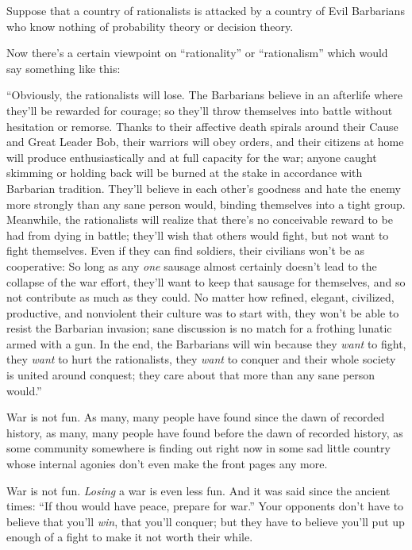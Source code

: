 {
 Suppose that a country of rationalists is attacked by a country of
Evil Barbarians who know nothing of probability theory or decision
theory.}

{
 Now there's a certain viewpoint on
``rationality'' or
``rationalism'' which would say
something like this:}

{
 ``Obviously, the rationalists will lose. The
Barbarians believe in an afterlife where they'll be
rewarded for courage; so they'll throw themselves into
battle without hesitation or remorse. Thanks to their affective death
spirals around their Cause and Great Leader Bob, their warriors will
obey orders, and their citizens at home will produce enthusiastically
and at full capacity for the war; anyone caught skimming or holding
back will be burned at the stake in accordance with Barbarian
tradition. They'll believe in each
other's goodness and hate the enemy more strongly than
any sane person would, binding themselves into a tight group.
Meanwhile, the rationalists will realize that there's
no conceivable reward to be had from dying in battle;
they'll wish that others would fight, but not want to
fight themselves. Even if they can find soldiers, their civilians
won't be as cooperative: So long as any \textit{one}
sausage almost certainly doesn't lead to the collapse
of the war effort, they'll want to keep that sausage
for themselves, and so not contribute as much as they could. No matter
how refined, elegant, civilized, productive, and nonviolent their
culture was to start with, they won't be able to resist
the Barbarian invasion; sane discussion is no match for a frothing
lunatic armed with a gun. In the end, the Barbarians will win because
they \textit{want} to fight, they \textit{want} to hurt the
rationalists, they \textit{want} to conquer and their whole society is
united around conquest; they care about that more than any sane person
would.''}

{
 War is not fun. As many, many people have found since the dawn of
recorded history, as many, many people have found before the dawn of
recorded history, as some community somewhere is finding out right now
in some sad little country whose internal agonies don't
even make the front pages any more.}

{
 War is not fun. \textit{Losing} a war is even less fun. And it was
said since the ancient times: ``If thou would have
peace, prepare for war.'' Your opponents
don't have to believe that you'll
\textit{win}, that you'll conquer; but they have to
believe you'll put up enough of a fight to make it not
worth their while.}


